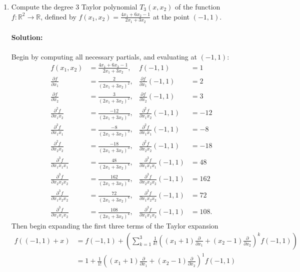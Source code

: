\documentclass{article}
\begin{document}
\begin{enumerate}
    \newpage

\item Compute the degree 3 Taylor polynomial $T_3(x,x_2)$ of the function $f: \mathbb{R}^2 \to \mathbb{R}$, defined by $f(x_1, x_2) = \frac{4x_1 + 6x_2 - 1}{2x_1 + 3x_2}$ at the point $(-1,1).$
    \paragraph{Solution: } Begin by computing all necessary partials, and evaluating at $(-1,1)$: 
    \begin{align*}
        f(x_1,x_2   )&= \frac{4x_1+6x_2-1}{2x_1+3x_2},&f(-1,1)&=1 \\
        \frac{\partial f}{\partial x_1} &= \frac{2}{(2x_1+3x_2)^2},& \frac{\partial f}{\partial x_1}(-1,1)&=2 \\
        \frac{\partial f}{\partial x_2} &= \frac{3}{(2x_1+3x_2)^2},& \frac{\partial f}{\partial x_2}(-1,1)&=3 \\
        \frac{\partial^2 f}{\partial x_1x_2} &= \frac{-12}{(2x_1+3x_2)^3},& \frac{\partial^2 f}{\partial x_1x_2}(-1,1)&=-12 \\
        \frac{\partial^2 f}{\partial x_1x_1} &= \frac{-8}{(2x_1+3x_2)^3},& \frac{\partial^2 f}{\partial x_1x_1}(-1,1)&=-8 \\
        \frac{\partial^2 f}{\partial x_2x_2} &= \frac{-18}{(2x_1+3x_2)^3},& \frac{\partial^2 f}{\partial x_2x_2}(-1,1)&=-18 \\
        \frac{\partial^3 f}{\partial x_1x_1x_1} &= \frac{48}{(2x_1+3x_2)^4},& \frac{\partial^3 f}{\partial x_1x_1x_1}(-1,1)&=48 \\
        \frac{\partial^3 f}{\partial x_2x_2x_2} &= \frac{162}{(2x_1+3x_2)^4},& \frac{\partial^3 f}{\partial x_2x_2x_2}(-1,1)&=162 \\
        \frac{\partial^3 f}{\partial x_1x_2x_2} &= \frac{72}{(2x_1+3x_2)^4},& \frac{\partial^3 f}{\partial x_1x_2x_2}(-1,1)&=72 \\
        \frac{\partial^3 f}{\partial x_1x_1x_2} &= \frac{108}{(2x_1+3x_2)^4},& \frac{\partial^3 f}{\partial x_1x_1x_2}(-1,1)&=108
    .\end{align*}
    Then begin expanding the first three terms of the Taylor expansion
    \begin{align*}
        f((-1,1)+x)&=f(-1,1)+\left(\sum\limits_{k=1}^{3}\frac{1}{k!}\left( (x_1+1)\frac{\partial }{\partial x_1} +(x_2-1)\frac{\partial }{\partial x_2}  \right) ^{k}f(-1,1)\right)\\
        &= 1+\frac{1}{1!}\left( (x_1+1)\frac{\partial }{\partial x_1} +(x_2-1)\frac{\partial }{\partial x_2}  \right) ^{1}f(-1,1)\\

\end{align*}
\end{enumerate}
\end{document}
